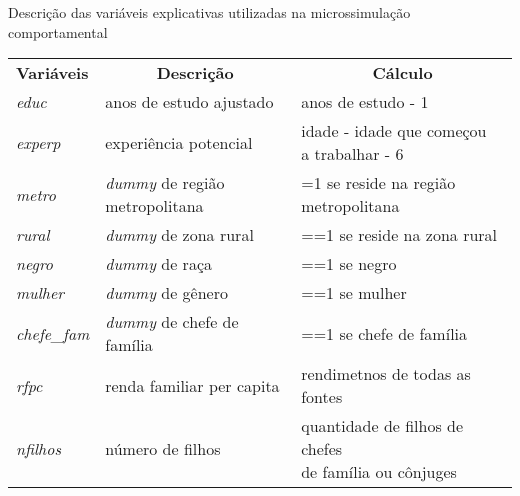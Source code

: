 \begin{apendicesenv}
	\newpage


	\begin{quadro}[h]
		\centering
		\small
		\begin{adjustwidth}{-1.5cm}{}
		\begin{threeparttable}
			\caption{Descrição das variáveis explicativas utilizadas na microssimulação comportamental}
			\begin{tabular}{|lll|}
				\hline
				\multirow{2}{*}{\textbf{Variáveis}} & \multicolumn{1}{c}{\multirow{2}{*}{\textbf{Descrição}}} & \multicolumn{1}{c|}{\multirow{2}{*}{\textbf{Cálculo}}} \\
				 & \multicolumn{1}{c}{} & \multicolumn{1}{c|}{} \\ \hline
				\textit{educ}           & anos de estudo ajustado                               & anos de estudo - 1                                                       \\[10pt] \hline
				\textit{experp}         & experiência potencial                                 & \makecell[l]{idade - idade que começou \\ a trabalhar - 6}               \\[10pt] \hline
				\textit{metro}          & \textit{dummy} de região metropolitana                & =1 se reside na região metropolitana                                     \\[10pt] \hline
				\textit{rural}          & \textit{dummy} de zona rural                          & ==1 se reside na zona rural                                              \\[10pt] \hline
				\textit{negro}          & \textit{dummy} de raça                                & ==1 se negro                                                             \\[10pt] \hline
				\textit{mulher}         & \textit{dummy} de gênero                              & ==1 se mulher                                                            \\[10pt] \hline
				\textit{chefe\_fam}     & \textit{dummy} de chefe de família                    & ==1 se chefe de família                                                  \\[10pt] \hline
				\textit{rfpc}           & renda familiar per capita                             & rendimetnos  de todas as fontes                                          \\[10pt] \hline
				\textit{nfilhos}        & número de filhos                                      & \makecell[l]{quantidade de filhos de chefes \\ de família ou cônjuges}   \\[10pt] \hline

\end{tabular}
\end{threeparttable}
\end{adjustwidth}
\end{quadro}
\end{apendicesenv}
